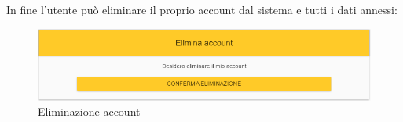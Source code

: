 In fine l'utente può eliminare il proprio account dal sistema e tutti i dati annessi:

\label{EliminaAccount}
\begin{figure}[ht]
	\centering
	\includegraphics[scale=0.50]{img/elimina_account.png}
	\caption{Eliminazione account}
\end{figure}
\FloatBarrier